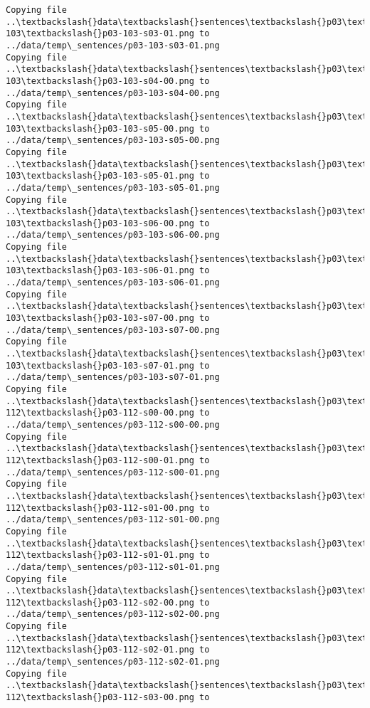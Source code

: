\documentclass[11pt]{article}
\begin{document}
\begin{Verbatim}[commandchars=\\\{\}]
Copying file ..\textbackslash{}data\textbackslash{}sentences\textbackslash{}p03\textbackslash{}p03-103\textbackslash{}p03-103-s03-01.png to
../data/temp\_sentences/p03-103-s03-01.png
Copying file ..\textbackslash{}data\textbackslash{}sentences\textbackslash{}p03\textbackslash{}p03-103\textbackslash{}p03-103-s04-00.png to
../data/temp\_sentences/p03-103-s04-00.png
Copying file ..\textbackslash{}data\textbackslash{}sentences\textbackslash{}p03\textbackslash{}p03-103\textbackslash{}p03-103-s05-00.png to
../data/temp\_sentences/p03-103-s05-00.png
Copying file ..\textbackslash{}data\textbackslash{}sentences\textbackslash{}p03\textbackslash{}p03-103\textbackslash{}p03-103-s05-01.png to
../data/temp\_sentences/p03-103-s05-01.png
Copying file ..\textbackslash{}data\textbackslash{}sentences\textbackslash{}p03\textbackslash{}p03-103\textbackslash{}p03-103-s06-00.png to
../data/temp\_sentences/p03-103-s06-00.png
Copying file ..\textbackslash{}data\textbackslash{}sentences\textbackslash{}p03\textbackslash{}p03-103\textbackslash{}p03-103-s06-01.png to
../data/temp\_sentences/p03-103-s06-01.png
Copying file ..\textbackslash{}data\textbackslash{}sentences\textbackslash{}p03\textbackslash{}p03-103\textbackslash{}p03-103-s07-00.png to
../data/temp\_sentences/p03-103-s07-00.png
Copying file ..\textbackslash{}data\textbackslash{}sentences\textbackslash{}p03\textbackslash{}p03-103\textbackslash{}p03-103-s07-01.png to
../data/temp\_sentences/p03-103-s07-01.png
Copying file ..\textbackslash{}data\textbackslash{}sentences\textbackslash{}p03\textbackslash{}p03-112\textbackslash{}p03-112-s00-00.png to
../data/temp\_sentences/p03-112-s00-00.png
Copying file ..\textbackslash{}data\textbackslash{}sentences\textbackslash{}p03\textbackslash{}p03-112\textbackslash{}p03-112-s00-01.png to
../data/temp\_sentences/p03-112-s00-01.png
Copying file ..\textbackslash{}data\textbackslash{}sentences\textbackslash{}p03\textbackslash{}p03-112\textbackslash{}p03-112-s01-00.png to
../data/temp\_sentences/p03-112-s01-00.png
Copying file ..\textbackslash{}data\textbackslash{}sentences\textbackslash{}p03\textbackslash{}p03-112\textbackslash{}p03-112-s01-01.png to
../data/temp\_sentences/p03-112-s01-01.png
Copying file ..\textbackslash{}data\textbackslash{}sentences\textbackslash{}p03\textbackslash{}p03-112\textbackslash{}p03-112-s02-00.png to
../data/temp\_sentences/p03-112-s02-00.png
Copying file ..\textbackslash{}data\textbackslash{}sentences\textbackslash{}p03\textbackslash{}p03-112\textbackslash{}p03-112-s02-01.png to
../data/temp\_sentences/p03-112-s02-01.png
Copying file ..\textbackslash{}data\textbackslash{}sentences\textbackslash{}p03\textbackslash{}p03-112\textbackslash{}p03-112-s03-00.png to

\end{Verbatim}
\end{document}
